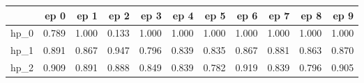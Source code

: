 \begin{tabular}{lrrrrrrrrrr}
\toprule
{} &   ep 0 &   ep 1 &   ep 2 &   ep 3 &   ep 4 &   ep 5 &   ep 6 &   ep 7 &   ep 8 &   ep 9 \\
\midrule
hp\_0 &  0.789 &  1.000 &  0.133 &  1.000 &  1.000 &  1.000 &  1.000 &  1.000 &  1.000 &  1.000 \\
hp\_1 &  0.891 &  0.867 &  0.947 &  0.796 &  0.839 &  0.835 &  0.867 &  0.881 &  0.863 &  0.870 \\
hp\_2 &  0.909 &  0.891 &  0.888 &  0.849 &  0.839 &  0.782 &  0.919 &  0.839 &  0.796 &  0.905 \\
\bottomrule
\end{tabular}
